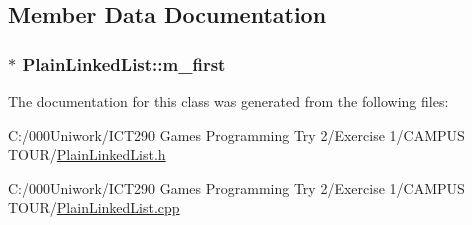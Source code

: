 \subsection{Member Data Documentation}
\subsubsection[{\texorpdfstring{m\+\_\+first}{m_first}}]{$\ast$ Plain\+Linked\+List\+::m\+\_\+first\hspace{0.3cm}{\ttfamily [private]}}\hypertarget{class_plain_linked_list_a622a6f6a5f2c8d82a67a5671b6bd4fce}{}\label{class_plain_linked_list_a622a6f6a5f2c8d82a67a5671b6bd4fce}


The documentation for this class was generated from the following files\+:\begin{DoxyCompactItemize}
\item 
C\+:/000\+Uniwork/\+I\+C\+T290 Games Programming Try 2/\+Exercise 1/\+C\+A\+M\+P\+U\+S T\+O\+U\+R/\hyperlink{_plain_linked_list_8h}{Plain\+Linked\+List.\+h}\item 
C\+:/000\+Uniwork/\+I\+C\+T290 Games Programming Try 2/\+Exercise 1/\+C\+A\+M\+P\+U\+S T\+O\+U\+R/\hyperlink{_plain_linked_list_8cpp}{Plain\+Linked\+List.\+cpp}\end{DoxyCompactItemize}
